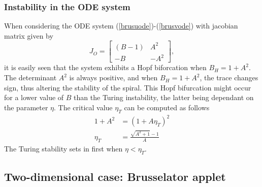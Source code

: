\subsubsection{Instability in the ODE system}
When considering the ODE system (\ref{brusuode})-(\ref{brusvode}) with jacobian matrix given by
\begin{equation}
J_O=\begin{bmatrix}(B-1) & A^2 \\ -B & -A^2\end{bmatrix},
\end{equation}
it is easily seen that the system exhibits a Hopf biforcation when $B_H=1+A^2$. The determinant $A^2$ is always positive, and when $B_H=1+A^2$, the trace changes sign, thus altering the stability of the spiral. This Hopf bifurcation might occur for a lower value of $B$ than the Turing instability, the latter being dependant on the parameter $\eta$. The critical value $\eta_T$ can be computed as follows
\begin{align}
1+A^2&=(1+A\eta_T)^2 \\
\eta_T&=\frac{\sqrt{A^2+1}-1}{A}
\end{align}
The Turing stability sets in first when $\eta<\eta_T$.
\subsection{Two-dimensional case: Brusselator applet}

